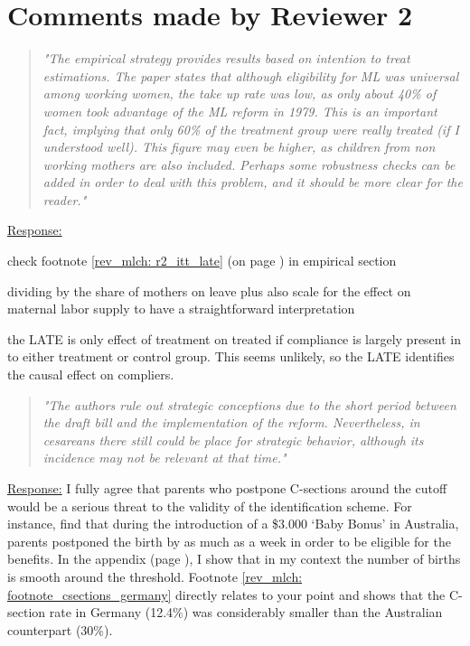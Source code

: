 
\clearpage
\section*{Comments made by Reviewer 2}


\begin{quote}
	\textit{"The empirical strategy provides results based on intention to treat estimations. The paper states that although eligibility for ML was universal among working women, the take up rate was low, as only about 40\% of women took advantage of the ML reform in 1979. This is an important fact, implying that only 60\% of the treatment group were really treated (if I understood well). This figure may even be higher, as children from non working mothers are also included. Perhaps some robustness checks can be added in order to deal with this problem, and it should be more clear for the reader."}
\end{quote}
\underline{Response:}

check footnote \ref{rev_mlch: r2_itt_late} (on page \pageref{rev_mlch: r2_itt_late})
in empirical section

dividing by the share of mothers on leave plus also scale for the effect on maternal labor supply to have a straightforward interpretation

the LATE is only effect of treatment on treated if compliance is largely present in to either treatment or control group. This seems unlikely, so the LATE identifies the causal effect on compliers.



% 
\begin{quote}
	\textit{"The authors rule out strategic conceptions due to the short period between the draft bill and the implementation of the reform. Nevertheless, in cesareans there still could be place for strategic behavior, although its incidence may not be relevant at that time."}
\end{quote}
\underline{Response:} I fully agree that parents who postpone C-sections around the cutoff would be a serious threat to the validity of the identification scheme. For instance, \cite{gans2009born} find that during the introduction of a \$3.000 `Baby Bonus' in Australia, parents postponed the birth by as much as a week in order to be eligible for the benefits. In the appendix (page \pageref{sec_mlch:empirical_strategy_threats+validity}), I show that in my context the number of births is smooth around the threshold. Footnote \ref{rev_mlch: footnote_csections_germany} directly relates to your point and shows that the C-section rate in Germany (12.4\%) was considerably smaller than the Australian counterpart (30\%).

